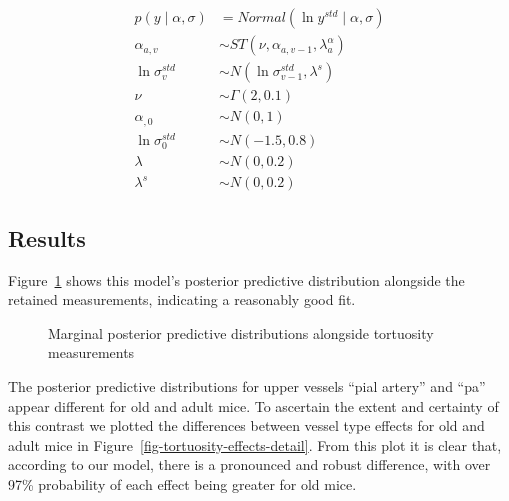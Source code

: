 \documentclass[
  letterpaper,
  DIV=11,
  numbers=noendperiod,
  oneside]{scrartcl}
\theoremstyle{plain}
\theoremstyle{remark}
\begin{document}
\begin{align}
p(y\mid\alpha, \sigma) &= Normal(\ln{y}^{std}\mid \alpha, \sigma) \label{eq:measurement-model-tortuosity} \\
\alpha_{a,v} &\sim ST(\nu, \alpha_{a,v-1}, \lambda^{\alpha}_a) \nonumber \\
\ln\sigma^{std}_{v} &\sim N(\ln\sigma^{std}_{v-1}, \lambda^s) \nonumber \\
\nu &\sim \Gamma(2, 0.1) \nonumber \\
\alpha_{,0} &\sim N(0, 1) \nonumber \\
\ln\sigma^{std}_{0} &\sim N(-1.5, 0.8) \nonumber \\ 
\lambda &\sim N(0, 0.2) \nonumber \\
\lambda^{s} &\sim N(0, 0.2) \nonumber 
\end{align}

\subsection{Results}\label{results-5}

Figure~\ref{fig-tortuosity-ppc} shows this model's posterior predictive
distribution alongside the retained measurements, indicating a
reasonably good fit.

\begin{figure}


\caption{\label{fig-tortuosity-ppc}Marginal posterior predictive
distributions alongside tortuosity measurements}

\end{figure}%

The posterior predictive distributions for upper vessels ``pial artery''
and ``pa'' appear different for old and adult mice. To ascertain the
extent and certainty of this contrast we plotted the differences between
vessel type effects for old and adult mice in
Figure~\ref{fig-tortuosity-effects-detail}. From this plot it is clear
that, according to our model, there is a pronounced and robust
difference, with over 97\% probability of each effect being greater for
old mice.
\end{document}
